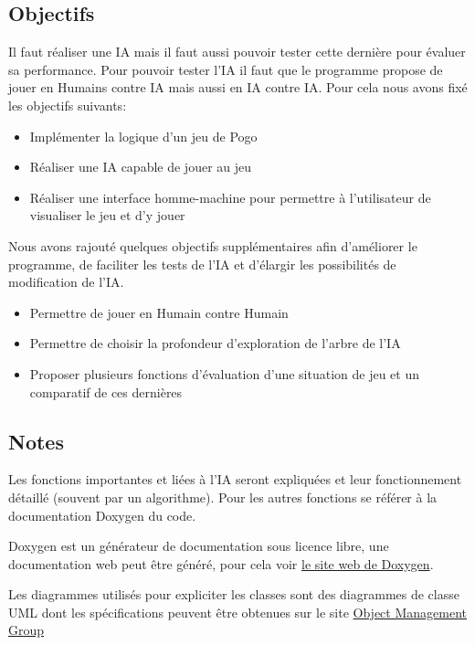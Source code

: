 \documentclass[article, backcover, french, nodocumentinfo]{upmethodology-document}
\begin{document}
		\subsection{Objectifs}
				Il faut réaliser une IA mais il faut aussi pouvoir tester cette dernière pour évaluer sa performance. Pour pouvoir tester l'IA il faut que le programme propose de jouer en Humains contre IA mais aussi en IA contre IA. Pour cela nous avons fixé les objectifs suivants:
				\begin{itemize}
					\item Implémenter la logique d'un jeu de Pogo
					\item Réaliser une IA capable de jouer au jeu
					\item Réaliser une interface homme-machine pour permettre à l'utilisateur de visualiser le jeu et d'y jouer
				\end{itemize}
				Nous avons rajouté quelques objectifs supplémentaires afin d'améliorer le programme, de faciliter les tests de l'IA et d'élargir les possibilités de modification de l'IA.
				\begin{itemize}
					\item Permettre de jouer en Humain contre Humain
					\item Permettre de choisir la profondeur d'exploration de l'arbre de l'IA
					\item Proposer plusieurs fonctions d'évaluation d'une situation de jeu et un comparatif de ces dernières
				\end{itemize}
		\subsection{Notes}
				Les fonctions importantes et liées à l'IA seront expliquées et leur fonctionnement détaillé (souvent par un algorithme). Pour les autres fonctions se référer à la documentation Doxygen du code.
				\begin{upminfo}
					Doxygen est un générateur de documentation sous licence libre, une documentation web peut être généré, pour cela voir \href{http://www.stack.nl/~dimitri/doxygen/}{le site web de Doxygen}.
				\end{upminfo}
				Les diagrammes utilisés pour expliciter les classes sont des diagrammes de classe UML dont les spécifications peuvent être obtenues sur le site \href{http://www.omg.org/spec/UML/}{Object Management Group}
\end{document}
